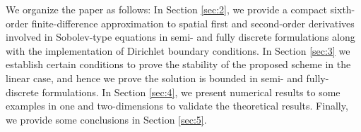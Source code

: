 \documentclass[11pt,a4paper]{amsart}
\theoremstyle{plain}
\theoremstyle{definition}
\theoremstyle{remark}
\numberwithin{equation}{section}
\begin{document}
We organize the paper as follows: In Section \ref{sec:2}, we provide a compact sixth-order finite-difference approximation to spatial first and second-order derivatives involved in Sobolev-type equations in semi- and fully discrete formulations along with the implementation of Dirichlet boundary conditions. In Section \ref{sec:3} we establish certain conditions to prove the stability of the proposed scheme in the linear case, and hence we prove the solution is bounded in semi- and fully-discrete formulations. In Section \ref{sec:4}, we present numerical results to some examples in one and two-dimensions to validate the theoretical results. Finally, we provide some conclusions in Section \ref{sec:5}.

\end{document}

